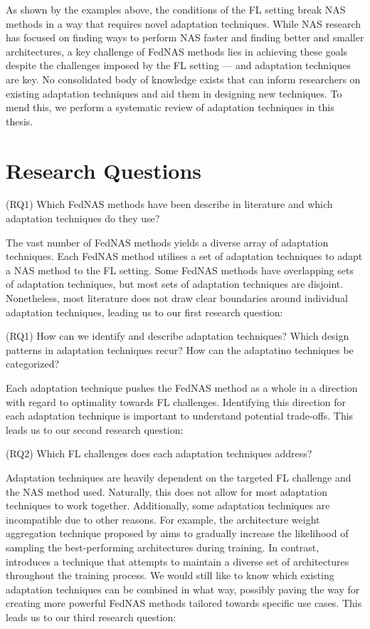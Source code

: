 As shown by the examples above, the conditions of the FL setting break NAS methods in a way that requires novel adaptation techniques. While NAS research has focused on finding ways to perform NAS faster and finding better and smaller architectures, a key challenge of FedNAS methods lies in achieving these goals despite the challenges imposed by the FL setting — and adaptation techniques are key. No consolidated body of knowledge exists that can inform researchers on existing adaptation techniques and aid them in designing new techniques. To mend this, we perform a systematic review of adaptation techniques in this thesis. 

\section{Research Questions}

(RQ1) Which FedNAS methods have been describe in literature and which adaptation techniques do they use?

The vast number of FedNAS methods yields a diverse array of adaptation techniques. Each FedNAS method utilises a set of adaptation techniques to adapt a NAS method to the FL setting. Some FedNAS methods have overlapping sets of adaptation techniques, but most sets of adaptation techniques are disjoint. Nonetheless, most literature does not draw clear boundaries around individual adaptation techniques, leading us to our first research question:

\vspace{1em}
(RQ1) How can we identify and describe adaptation techniques? Which design patterns in adaptation techniques recur? How can the adaptatino techniques be categorized?
\vspace{1em}

Each adaptation technique pushes the FedNAS method as a whole in a direction with regard to optimality towards FL challenges. Identifying this direction for each adaptation technique is important to understand potential trade-offs. This leads us to our second research question:

\vspace{1em}
(RQ2) Which FL challenges does each adaptation techniques address?
\vspace{1em}

Adaptation techniques are heavily dependent on the targeted FL challenge and the NAS method used. Naturally, this does not allow for most adaptation techniques to work together. Additionally, some adaptation techniques are incompatible due to other reasons. For example, the architecture weight aggregation technique proposed by \cite{efnas_2024} aims to gradually increase the likelihood of sampling the best-performing architectures during training. In contrast, \cite{superfednas_2024} introduces a technique that attempts to maintain a diverse set of architectures throughout the training process. We would still like to know which existing adaptation techniques can be combined in what way, possibly paving the way for creating more powerful FedNAS methods tailored towards specific use cases. This leads us to our third research question:

